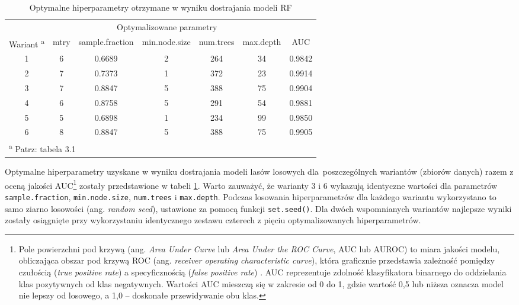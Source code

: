 \documentclass{amuthesis}
\begin{document}
\hypertarget{tbl-tabela-tuning}{}
\begin{table}
\caption{\label{tbl-tabela-tuning}Optymalne hiperparametry otrzymane w wyniku dostrajania modeli RF }\tabularnewline

\centering
\begin{tabular}{ccccccc}
\toprule
\multicolumn{1}{c}{ } & \multicolumn{5}{c}{Optymalizowane parametry} & \multicolumn{1}{c}{ } \\
\cmidrule(l{3pt}r{3pt}){2-6}
Wariant \textsuperscript{a} & mtry & sample.fraction & min.node.size & num.trees & max.depth & AUC\\
\midrule
1 & 6 & 0.6689 & 2 & 264 & 34 & 0.9842\\
2 & 7 & 0.7373 & 1 & 372 & 23 & 0.9914\\
3 & 7 & 0.8847 & 5 & 388 & 75 & 0.9904\\
4 & 6 & 0.8758 & 5 & 291 & 54 & 0.9881\\
5 & 5 & 0.6898 & 1 & 234 & 99 & 0.9850\\
6 & 8 & 0.8847 & 5 & 388 & 75 & 0.9905\\
\bottomrule
\multicolumn{7}{l}{\textsuperscript{a} Patrz: tabela 3.1}\\
\end{tabular}
\end{table}

Optymalne hiperparametry uzyskane w wyniku dostrajania modeli lasów
losowych dla~poszczególnych wariantów (zbiorów danych) razem z oceną
jakości AUC\footnote{Pole powierzchni pod krzywą (ang. \emph{Area Under
  Curve} lub \emph{Area Under the ROC Curve}, AUC lub AUROC) to miara
  jakości modelu, obliczająca obszar pod krzywą ROC (ang. \emph{receiver
  operating characteristic curve}), która graficznie przedstawia
  zależność pomiędzy czułością (\emph{true positive rate}) a
  specyficznością (\emph{false positive rate})
  \autocite{jaworski_2013_perfomance_measures}. AUC reprezentuje
  zdolność klasyfikatora binarnego do oddzielania klas pozytywnych od
  klas negatywnych. Wartości AUC mieszczą się w zakresie od 0 do 1,
  gdzie wartość 0,5 lub niższa oznacza model nie lepszy od losowego, a
  1,0 -- doskonałe przewidywanie obu klas.} zostały przedstawione w
tabeli \ref{tbl-tabela-tuning}. Warto zauważyć, że warianty 3 i 6
wykazują identyczne wartości dla parametrów \texttt{sample.fraction},
\texttt{min.node.size}, \texttt{num.trees} i \texttt{max.depth}. Podczas
losowania hiperparametrów dla każdego wariantu wykorzystano to samo
ziarno losowości (ang. \emph{random seed}), ustawione za pomocą funkcji
\texttt{set.seed()}. Dla dwóch wspomnianych wariantów najlepsze wyniki
zostały osiągnięte przy wykorzystaniu identycznego zestawu czterech z
pięciu optymalizowanych hiperparametrów.
\end{document}
